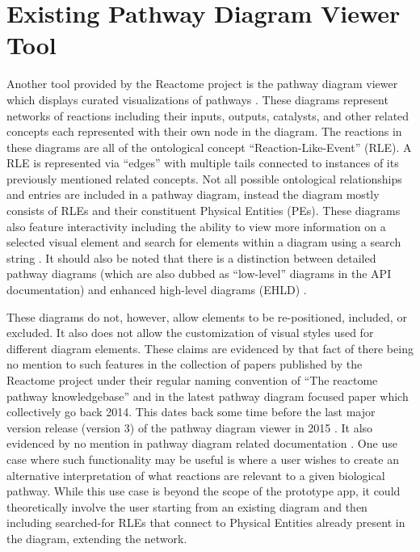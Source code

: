 \documentclass[12pt, letterpaper]{report}
\begin{document}
\section{Existing Pathway Diagram Viewer Tool}
Another tool provided by the Reactome project is the pathway diagram viewer which displays curated visualizations of pathways \cite{PathwayDiagramsSpecifications}. These diagrams represent networks of reactions including their inputs, outputs, catalysts, and other related concepts each represented with their own node in the diagram. The reactions in these diagrams are all of the ontological concept ``Reaction-Like-Event'' (RLE). A RLE is represented via ``edges'' with multiple tails connected to instances of its previously mentioned related concepts. Not all possible ontological relationships and entries are included in a pathway diagram, instead the diagram mostly consists of RLEs and their constituent Physical Entities (PEs). These diagrams also feature interactivity including the ability to view more information on a selected visual element and search for elements within a diagram using a search string \cite {FabregatAntonio2018RgdE}. It should also be noted that there is a distinction between detailed pathway diagrams (which are also dubbed as ``low-level'' diagrams in the API documentation) and enhanced high-level diagrams (EHLD) \cite{ThePathwayBrowserGeneralDescription, ContentServiceAPIDocumentation}.

These diagrams do not, however, allow elements to be re-positioned, included, or excluded. It also does not allow the customization of visual styles used for different diagram elements. These claims are evidenced by that fact of there being no mention to such features in the collection of papers published by the Reactome project under their regular naming convention of ``The reactome pathway knowledgebase'' \cite{CroftDavid2014TRpk, FabregatA.2016Trpk, FabregatAntonio2018TRPK, JassalB.2020Trpk} and in the latest pathway diagram focused paper \cite{FabregatAntonio2018Rdvd} which collectively go back 2014. This dates back some time before the last major version release (version 3) of the pathway diagram viewer in 2015 \cite{FabregatA.2016Trpk}. It also evidenced by no mention in pathway diagram related documentation \cite{ThePathwayBrowserGeneralDescription, PathwayDiagramsSpecifications}. One use case where such functionality may be useful is where a user wishes to create an alternative interpretation of what reactions are relevant to a given biological pathway. While this use case is beyond the scope of the prototype app, it could theoretically involve the user starting from an existing diagram and then including searched-for RLEs that connect to Physical Entities already present in the diagram, extending the network.
\end{document}
